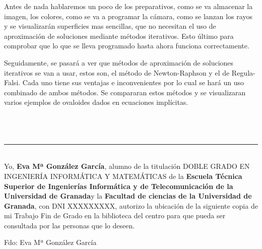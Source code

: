 Antes de nada hablaremos un poco de los preparativos, como se va almacenar la imagen, los colores, como se va a programar la cámara, como se lanzan los rayos y se visualizarán superficies mas sencillas, que no necesitan el uso de aproximación de soluciones mediante métodos iterativos. Esto último para comprobar que lo que se lleva programado hasta ahora funciona correctamente.

Seguidamente, se pasará a ver que métodos de aproximación de soluciones iterativos se van a usar, estos son, el método de Newton-Raphson y el de Regula-Falsi. Cada uno tiene sus ventajas e inconvenientes por lo cual se hará un uso combinado de ambos métodos. Se compararan estos métodos y se visualizaran varios ejemplos de ovaloides dados en ecuaciones implícitas.








\vspace{0.7cm}
\\

\chapter*{}
\thispagestyle{empty}

\noindent\rule[-1ex]{\textwidth}{2pt}\\[4.5ex]

Yo, \textbf{Eva Mª González García}, alumno de la titulación DOBLE GRADO EN INGENIERÍA INFORMÁTICA Y MATEMÁTICAS de la \textbf{Escuela Técnica Superior
de Ingenierías Informática y de Telecomunicación de la Universidad de Granada}y la \textbf{Facultad de ciencias de la Universidad de Granada}, con DNI XXXXXXXXX, autorizo la
ubicación de la siguiente copia de mi Trabajo Fin de Grado en la biblioteca del centro para que pueda ser
consultada por las personas que lo deseen.

\vspace{6cm}

\noindent Fdo: Eva Mª González García

\vspace{2cm}


